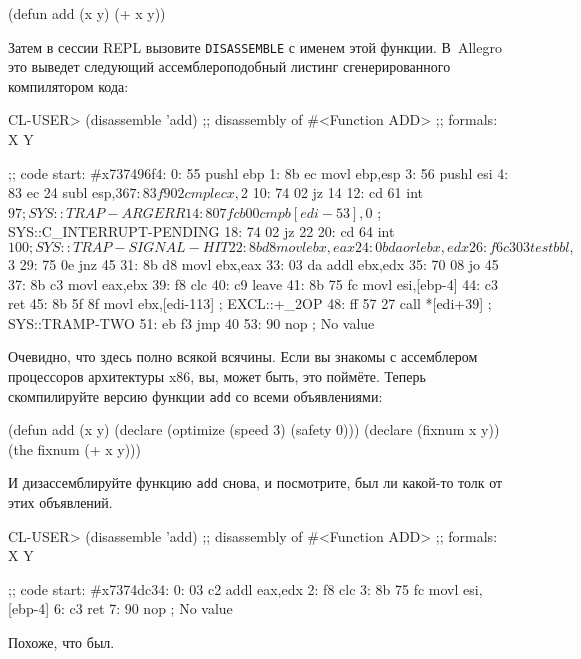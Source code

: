 \begin{myverb}
(defun add (x y) (+ x y))
\end{myverb}

Затем в сессии REPL вызовите \lstinline{DISASSEMBLE} с именем этой функции. В~Allegro это
выведет следующий ассемблероподобный листинг сгенерированного компилятором кода:

\begin{myverb}
CL-USER> (disassemble 'add)
;; disassembly of #<Function ADD>
;; formals: X Y

;; code start: #x737496f4:
   0: 55         pushl	ebp
   1: 8b ec    movl	ebp,esp
   3: 56         pushl	esi
   4: 83 ec 24 subl	esp,$36
   7: 83 f9 02 cmpl	ecx,$2
  10: 74 02    jz	14
  12: cd 61    int	$97   ; SYS::TRAP-ARGERR
  14: 80 7f cb 00 cmpb	[edi-53],$0        ; SYS::C_INTERRUPT-PENDING
  18: 74 02    jz	22
  20: cd 64    int	$100  ; SYS::TRAP-SIGNAL-HIT
  22: 8b d8    movl	ebx,eax
  24: 0b da    orl	ebx,edx
  26: f6 c3 03 testb	bl,$3
  29: 75 0e    jnz	45
  31: 8b d8    movl	ebx,eax
  33: 03 da    addl	ebx,edx
  35: 70 08    jo	45
  37: 8b c3    movl	eax,ebx
  39: f8         clc
  40: c9         leave
  41: 8b 75 fc movl	esi,[ebp-4]
  44: c3         ret
  45: 8b 5f 8f movl	ebx,[edi-113]    ; EXCL::+_2OP
  48: ff 57 27 call	*[edi+39]   ; SYS::TRAMP-TWO
  51: eb f3    jmp	40
  53: 90         nop
; No value
\end{myverb}

Очевидно, что здесь полно всякой всячины. Если вы знакомы с ассемблером процессоров
архитектуры x86, вы, может быть, это поймёте. Теперь скомпилируйте версию функции \lstinline{add}
со всеми объявлениями:

\begin{myverb}
(defun add (x y)
  (declare (optimize (speed 3) (safety 0)))
  (declare (fixnum x y))
  (the fixnum (+ x y)))
\end{myverb}

И дизассемблируйте функцию \lstinline{add} снова, и посмотрите, был ли какой-то толк от
этих объявлений.

\begin{myverb}
CL-USER> (disassemble 'add)
;; disassembly of #<Function ADD>
;; formals: X Y

;; code start: #x7374dc34:
   0: 03 c2    addl	eax,edx
   2: f8         clc
   3: 8b 75 fc movl	esi,[ebp-4]
   6: c3         ret
   7: 90         nop
; No value
\end{myverb}

Похоже, что был.

